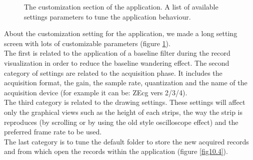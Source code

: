 \begin{figure}[!htb]
	\centering
	\qquad 
	\caption{The customization section of the application. A list of available settings parameters to tune the application behaviour.}  
	\label{fig10.10}
\end{figure}
About the customization setting for the application, we made a long setting screen with lots of customizable parameters (figure \ref{fig10.10}).\\
The first is related to the application of a baseline filter during the record visualization in order to reduce the baseline wandering effect. The second category of settings are related to the acquisition phase. It includes the acquisition format, the gain, the sample rate, quantization and the name of the acquisition device (for example it can be: ZEcg vers 2/3/4).\\
The third category is related to the drawing settings. These settings will affect only the graphical views such as the height of each strips, the way the strip is reproduces (by scrolling or by using the old style oscilloscope effect) and the preferred frame rate to be used.\\
The last category is to tune the default folder to store the new acquired records and from which open the records within the application (figure \ref{fig10.4}).

